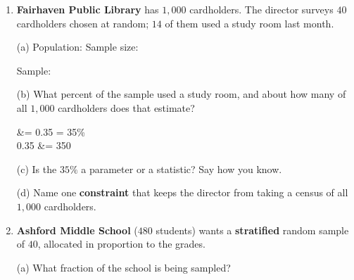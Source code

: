 \documentclass[10pt]{article}
\begin{document}
\begin{enumerate}[leftmargin=2.2em, itemsep=9pt, topsep=2pt]
\vspace{4pt}
(b) Write a \textbf{conclusion in context} about the most common method, naming the group it
applies to.

\par\writeline
\par\writeline

\vspace{2pt}
(c) All $40$ students were asked while they waited in the bus line. At which \textbf{stage of
the data cycle} did the problem enter, and why that stage?

\par\writeline
\par\writeline

\boxguard[22]
\item \textbf{Fairhaven Public Library} has $1{,}000$ cardholders. The director surveys $40$
cardholders chosen at random; $14$ of them used a study room last month.

\vspace{2pt}
(a) Population: \blank{4.4cm} \quad Sample size: \blank{1.8cm}

\vspace{3pt}
Sample: \blank{9.0cm}

\vspace{3pt}
(b) What percent of the sample used a study room, and about how many of all $1{,}000$
cardholders does that estimate?

\begin{work}
   &= 0.35 = 35\% \\
  0.35  &= 350 
\end{work}

(c) Is the $35\%$ a parameter or a statistic? Say how you know.

\par\writeline

(d) Name one \textbf{constraint} that keeps the director from taking a census of all $1{,}000$
cardholders.

\par\writeline

\boxguard[26]
\item \textbf{Ashford Middle School} ($480$ students) wants a \textbf{stratified} random
sample of $40$, allocated in proportion to the grades.

\vspace{2pt}
(a) What fraction of the school is being sampled?


\end{enumerate}
\end{document}
